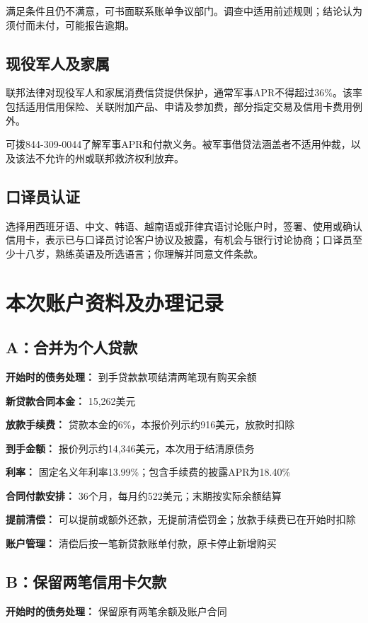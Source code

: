 \documentclass[UTF8,fontset=none,11pt,a4paper]{ctexart}
\begin{document}
满足条件且仍不满意，可书面联系账单争议部门。调查中适用前述规则；结论认为须付而未付，可能报告逾期。


\subsection*{现役军人及家属}
联邦法律对现役军人和家属消费信贷提供保护，通常军事APR不得超过36\%。该率包括适用信用保险、关联附加产品、申请及参加费，部分指定交易及信用卡费用例外。


可拨844-309-0044了解军事APR和付款义务。被军事借贷法涵盖者不适用仲裁，以及该法不允许的州或联邦救济权利放弃。


\subsection*{口译员认证}
选择用西班牙语、中文、韩语、越南语或菲律宾语讨论账户时，签署、使用或确认信用卡，表示已与口译员讨论客户协议及披露，有机会与银行讨论协商；口译员至少十八岁，熟练英语及所选语言；你理解并同意文件条款。


\section*{本次账户资料及办理记录}
\subsection*{A：合并为个人贷款}
\textbf{开始时的债务处理：} 到手贷款款项结清两笔现有购买余额


\textbf{新贷款合同本金：} 15,262美元


\textbf{放款手续费：} 贷款本金的6\%，本报价列示约916美元，放款时扣除


\textbf{到手金额：} 报价列示约14,346美元，本次用于结清原债务


\textbf{利率：} 固定名义年利率13.99\%；包含手续费的披露APR为18.40\%


\textbf{合同付款安排：} 36个月，每月约522美元；末期按实际余额结算


\textbf{提前清偿：} 可以提前或额外还款，无提前清偿罚金；放款手续费已在开始时扣除


\textbf{账户管理：} 清偿后按一笔新贷款账单付款，原卡停止新增购买


\subsection*{B：保留两笔信用卡欠款}
\textbf{开始时的债务处理：} 保留原有两笔余额及账户合同
\end{document}
